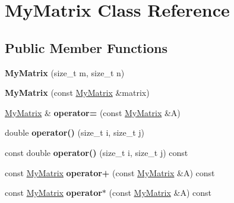 \hypertarget{class_my_matrix}{}\section{My\+Matrix Class Reference}
\label{class_my_matrix}
\subsection*{Public Member Functions}
\begin{DoxyCompactItemize}
\item 
\hypertarget{class_my_matrix_ab1ff87572b350796c34a7126ecad58e3}{}{\bfseries My\+Matrix} (size\+\_\+t m, size\+\_\+t n)\label{class_my_matrix_ab1ff87572b350796c34a7126ecad58e3}

\item 
\hypertarget{class_my_matrix_ad2a30d6517575ce1fafe79846fd0b0a3}{}{\bfseries My\+Matrix} (const \hyperlink{class_my_matrix}{My\+Matrix} \&matrix)\label{class_my_matrix_ad2a30d6517575ce1fafe79846fd0b0a3}

\item 
\hypertarget{class_my_matrix_afcef6ffc77dbfc35f96cb9aec5cd3fe1}{}\hyperlink{class_my_matrix}{My\+Matrix} \& {\bfseries operator=} (const \hyperlink{class_my_matrix}{My\+Matrix} \&A)\label{class_my_matrix_afcef6ffc77dbfc35f96cb9aec5cd3fe1}

\item 
\hypertarget{class_my_matrix_a048397702ae6ee4ea2cdd7bb1b70c044}{}double {\bfseries operator()} (size\+\_\+t i, size\+\_\+t j)\label{class_my_matrix_a048397702ae6ee4ea2cdd7bb1b70c044}

\item 
\hypertarget{class_my_matrix_a1824720b9efcf5f7a0469ec3131c2d72}{}const double {\bfseries operator()} (size\+\_\+t i, size\+\_\+t j) const \label{class_my_matrix_a1824720b9efcf5f7a0469ec3131c2d72}

\item 
\hypertarget{class_my_matrix_a0ec5ea541ba3e65695434846380661ad}{}const \hyperlink{class_my_matrix}{My\+Matrix} {\bfseries operator+} (const \hyperlink{class_my_matrix}{My\+Matrix} \&A) const \label{class_my_matrix_a0ec5ea541ba3e65695434846380661ad}

\item 
\hypertarget{class_my_matrix_af793714983cff4789f5cebc9ccb964f0}{}const \hyperlink{class_my_matrix}{My\+Matrix} {\bfseries operator$\ast$} (const \hyperlink{class_my_matrix}{My\+Matrix} \&A) const \label{class_my_matrix_af793714983cff4789f5cebc9ccb964f0}


\end{DoxyCompactItemize}

